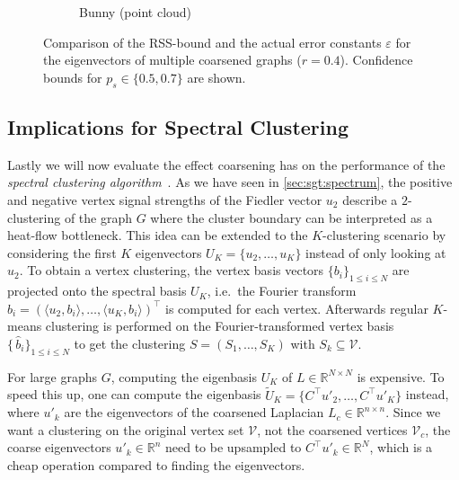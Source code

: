 \begin{figure}[ht]
\begin{subfigure}{0.33\textwidth}
		\caption{Bunny (point cloud)}\label{fig:cons:example:bunny}
	\end{subfigure}
	\caption{%
		Comparison of the RSS-bound and the actual error constants $\varepsilon$ for the eigenvectors of multiple coarsened graphs ($r = 0.4$).
		Confidence bounds for $p_s \in \{0.5, 0.7\}$ are shown.
	}\label{fig:cons:example}
\end{figure}

\subsection{Implications for Spectral Clustering}%
\label{sec:cons:sc}

Lastly we will now evaluate the effect coarsening has on the performance of the \textit{spectral clustering algorithm}~\cite{Luxburg2007}.
As we have seen in \cref{sec:sgt:spectrum}, the positive and negative vertex signal strengths of the Fiedler vector $u_2$ describe a $2$-clustering of the graph $G$ where the cluster boundary can be interpreted as a heat-flow bottleneck.
This idea can be extended to the $K$-clustering scenario by considering the first $K$ eigenvectors $U_K = \{ u_2, \dots, u_K \}$ instead of only looking at $u_2$.
To obtain a vertex clustering, the vertex basis vectors ${\{ b_i \}}_{1 \leq i \leq N}$ are projected onto the spectral basis $U_K$, i.e.\ the Fourier transform $\widehat{b}_i = {(\langle u_2, b_i \rangle, \dots, \langle u_K, b_i \rangle)}^\top$ is computed for each vertex.
Afterwards regular $K$-means clustering is performed on the Fourier-transformed vertex basis ${\{\,\widehat{b}_i \}}_{1 \leq i \leq N}$ to get the clustering $S = (S_1, \dots, S_K)$ with $S_k \subseteq \mathcal{V}$.

For large graphs $G$, computing the eigenbasis $U_K$ of $L \in \mathbb{R}^{N \times N}$ is expensive.
To speed this up, one can compute the eigenbasis $\widetilde{U}_K = \{ C^\top u'_2, \dots, C^\top u'_K \}$ instead, where $u'_k$ are the eigenvectors of the coarsened Laplacian $L_c \in \mathbb{R}^{n \times n}$.
Since we want a clustering on the original vertex set $\mathcal{V}$, not the coarsened vertices $\mathcal{V}_c$, the coarse eigenvectors $u'_k \in \mathbb{R}^n$ need to be upsampled to $C^\top u'_k \in \mathbb{R}^N$, which is a cheap operation compared to finding the eigenvectors.


